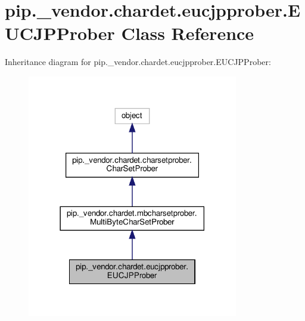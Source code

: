 \hypertarget{classpip_1_1__vendor_1_1chardet_1_1eucjpprober_1_1EUCJPProber}{}\section{pip.\+\_\+vendor.\+chardet.\+eucjpprober.\+E\+U\+C\+J\+P\+Prober Class Reference}
\label{classpip_1_1__vendor_1_1chardet_1_1eucjpprober_1_1EUCJPProber}


Inheritance diagram for pip.\+\_\+vendor.\+chardet.\+eucjpprober.\+E\+U\+C\+J\+P\+Prober\+:
\nopagebreak
\begin{figure}[H]
\begin{center}
\leavevmode
\includegraphics[width=261pt]{classpip_1_1__vendor_1_1chardet_1_1eucjpprober_1_1EUCJPProber__inherit__graph}
\end{center}
\end{figure}


